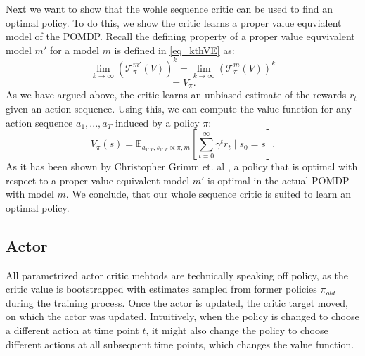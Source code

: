 Next we want to show that the wohle sequence critic can be used to find an optimal policy. 
To do this, we show the critic learns a proper value equvialent model of the POMDP. Recall the defining property of a proper 
value equvivalent model $m'$ for a model $m$ is defined in \ref{eq_kthVE} as:
\begin{equation*}
   \lim_{k \rightarrow \infty} \left(\mathcal{T}^{m'}_{\pi}(V)\right)^k = \lim_{k \rightarrow \infty} \left(\mathcal{T}^{m}_{\pi}(V)\right)^k
\end{equation*}
\begin{equation}
    = V_{\pi}.
\end{equation}
As we have argued above, the critic learns an unbiased estimate of the rewards $r_t$ given an action sequence. Using this, we can compute the value function for 
any action sequence $a_1, ..., a_T$ induced by a policy $\pi$:
\begin{equation*}
    V_{\pi}(s) = \mathbb{E}_{a_{1:T}, s_{1:T} \propto \pi, m}\left[\sum_{t=0}^{\infty} \gamma^t r_t \mid s_0 = s\right].
\end{equation*}
As it has been shown by Christopher Grimm et. al \cite{grimm2021proper}, a policy that is optimal with respect to a proper value equivalent model $m'$ is optimal 
in the actual POMDP with model $m$. We conclude, that our whole sequence critic is suited to learn an optimal policy.

\subsection{Actor}
\label{sec:AC_actor}
All parametrized actor critic mehtods are technically speaking off policy, as the critic value is bootstrapped with estimates sampled from former policies $\pi_{old}$ during the training process. 
Once the actor is updated, the 
critic target moved, on which the actor was updated. Intuitively, when the policy is changed to choose a different action at time point $t$, it might also change 
the policy to choose different actions at 
all subsequent time points, which changes the value function. \\

